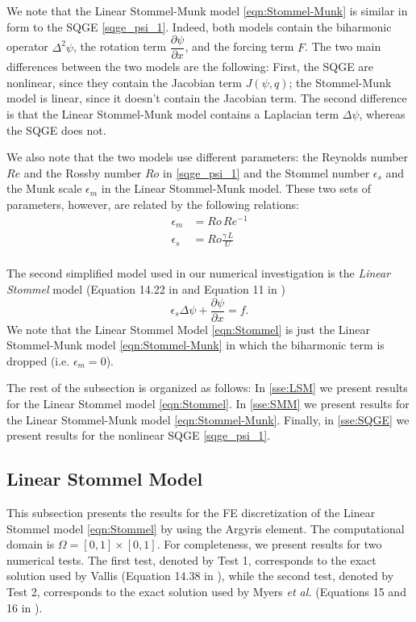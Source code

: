 We note that the Linear Stommel-Munk model \eqref{eqn:Stommel-Munk} is similar in form to the SQGE
\eqref{sqge_psi_1}. Indeed, both models contain the biharmonic operator $\Delta^2 \psi$, the rotation
term $\dfrac{\partial \psi}{\partial x}$, and the forcing term $F$. The two main differences between
the two models are the following: First, the SQGE are nonlinear, since they contain the Jacobian term
$J(\psi,q)$; the Stommel-Munk model is linear, since it doesn't contain the Jacobian term. The
second difference is that the Linear Stommel-Munk model contains a Laplacian term $\Delta \psi$,
whereas the SQGE does not.

We also note that the two models use different parameters: the Reynolds number $Re$ and the Rossby
number $Ro$ in \eqref{sqge_psi_1} and the Stommel number $\epsilon_s$ and the Munk scale $\epsilon_m$
in the Linear Stommel-Munk model. These two sets of parameters, however, are related by the
following relations:
\begin{align}
  \epsilon_m &= Ro\, Re^{-1} \label{eqn:MunkScale}\\
  \epsilon_s &= Ro \frac{\gamma\, L}{U} \label{eqn:StommelNumber}\\
\end{align}

The second simplified model used in our numerical investigation is the \emph{Linear Stommel} model
(Equation 14.22 in \cite{Vallis06} and Equation 11 in \cite{Myers}) 
\begin{equation}
  \epsilon_s \Delta \psi + \frac{\partial \psi}{\partial x} = f.
  \label{eqn:Stommel}
\end{equation}
We note that the Linear Stommel Model \eqref{eqn:Stommel} is just the Linear Stommel-Munk model
\eqref{eqn:Stommel-Munk} in which the biharmonic term is dropped (i.e. $\epsilon_m=0$).

The rest of the subsection is organized as follows: In \autoref{sse:LSM} we present results for the
Linear Stommel model \eqref{eqn:Stommel}. In \autoref{sse:SMM} we present results for the Linear
Stommel-Munk model \eqref{eqn:Stommel-Munk}. Finally, in \autoref{sse:SQGE} we present results for
the nonlinear SQGE \eqref{sqge_psi_1}. 

\subsection{Linear Stommel Model} \label{sse:LSM}
This subsection presents the results for the FE discretization of the Linear Stommel model
\eqref{eqn:Stommel} by using the Argyris element. The computational domain is $\Omega = [0,1]\times
[0,1]$. For completeness, we present results for two numerical tests. The first test, denoted by
Test 1, corresponds to the exact solution used by Vallis (Equation 14.38 in \cite{Vallis06}), while
the second test, denoted by Test 2, corresponds to the exact solution used by Myers \emph{et al.}
(Equations 15 and 16 in \cite{Myers}).

